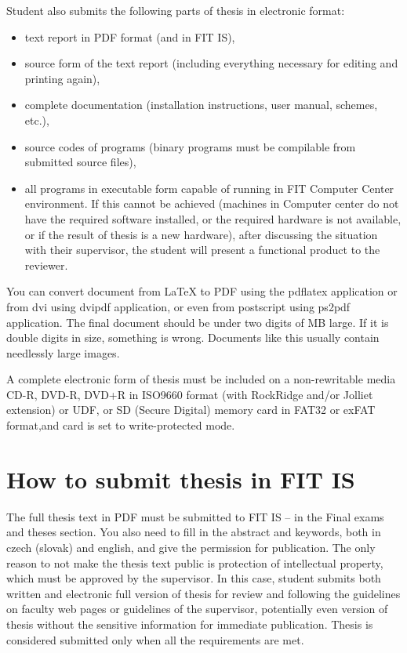 {{Student also submits the following parts of thesis in electronic format:
\begin{itemize}
  \item{text report in PDF format (and in FIT IS),}
  \item{source form of the text report (including everything necessary for editing and printing again),}
  \item{complete documentation (installation instructions, user manual, schemes, etc.),}
  \item{source codes of programs (binary programs must be compilable from submitted source files),}
  \item{all programs in executable form capable of running in FIT Computer Center environment. If this cannot be achieved (machines in Computer center do not have the required software installed, or the required hardware is not available, or if the result of thesis is a new hardware), after discussing the situation with their supervisor, the student will present a functional product to the reviewer.}
\end{itemize}

You can convert document from LaTeX to PDF using the pdflatex application or from dvi using dvipdf application, or even from postscript using ps2pdf application. The final document should be under two digits of MB large. If it is double digits in size, something is wrong. Documents like this usually contain needlessly large images.

A complete electronic form of thesis must be included on a non-rewritable media CD-R, DVD-R, DVD+R in ISO9660 format (with RockRidge and/or Jolliet extension) or UDF, or SD (Secure Digital) memory card in FAT32 or exFAT format,and card is set to write-protected mode.


\section{How to submit thesis in FIT IS}
The full thesis text in PDF must be submitted to FIT IS -- in the Final exams and theses section. You also need to fill in the abstract and keywords, both in czech (slovak) and english, and give the permission for publication. The only reason to not make the thesis text public is protection of intellectual property, which must be approved by the supervisor. In this case, student submits both written and electronic full version of thesis for review and following the guidelines on faculty web pages or guidelines of the supervisor, potentially even version of thesis without the sensitive information for immediate publication. Thesis is considered submitted only when all the requirements are met.

}}

